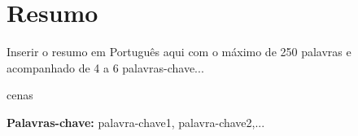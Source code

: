 
\section*{Resumo}


Inserir o resumo em Portugu\^{e}s aqui com o máximo de 250 palavras e acompanhado de 4 a 6 palavras-chave...

cenas

\vfill

\textbf{\Large Palavras-chave:} palavra-chave1, palavra-chave2,...

\cleardoublepage

